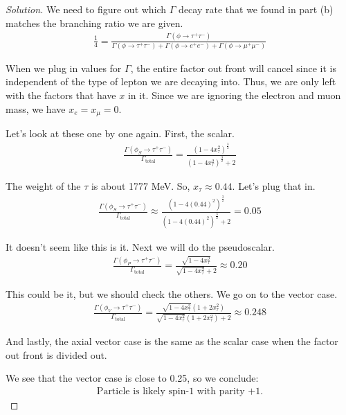 \documentclass[12pt]{article}
\newenvironment{solution}{\begin{proof}[Solution]}{\end{proof}}
\begin{document}
\begin{solution}
We need to figure out which $\Gamma$ decay rate that we found in part (b) matches the branching ratio we are given. 
\begin{align*}
    \frac{1}{4}=\frac{\Gamma(\phi\rightarrow \tau^+\tau^-)}{\Gamma(\phi\rightarrow \tau^+\tau^-)+\Gamma(\phi\rightarrow e^+e^-)+\Gamma(\phi\rightarrow \mu^+\mu^-)}
\end{align*}

When we plug in values for $\Gamma$, the entire factor out front will cancel since it is independent of the type of lepton we are decaying into. Thus, we are only left with the factors that have $x$ in it. Since we are ignoring the electron and muon mass, we have $x_e=x_\mu=0$.

Let's look at these one by one again. First, the scalar.
\begin{align*}
    \frac{\Gamma(\phi_S\rightarrow \tau^+\tau^-)}{\Gamma_{\text{total}}}=\frac{(1-4x_\tau^2)^\frac{3}{2}}{(1-4x_\tau^2)^\frac{3}{2}+2}
\end{align*}

The weight of the $\tau$ is about 1777 MeV. So, $x_\tau\approx 0.44$. Let's plug that in.
\begin{align*}
    \frac{\Gamma(\phi_S\rightarrow \tau^+\tau^-)}{\Gamma_{\text{total}}}\approx\frac{(1-4(0.44)^2)^\frac{3}{2}}{(1-4(0.44)^2)^\frac{3}{2}+2}=0.05
\end{align*}

It doesn't seem like this is it. Next we will do the pseudoscalar.
\begin{align*}
    \frac{\Gamma(\phi_P\rightarrow \tau^+\tau^-)}{\Gamma_{\text{total}}}=\frac{\sqrt{1-4x_\tau^2}}{\sqrt{1-4x_\tau^2}+2}\approx 0.20
\end{align*}

This could be it, but we should check the others. We go on to the vector case.
\begin{align*}
    \frac{\Gamma(\phi_V\rightarrow \tau^+\tau^-)}{\Gamma_{\text{total}}}=\frac{\sqrt{1-4x_\tau^2}(1+2x_\tau^2)}{\sqrt{1-4x_\tau^2}(1+2x_\tau^2)+2}\approx 0.248
\end{align*}

And lastly, the axial vector case is the same as the scalar case when the factor out front is divided out.

We see that the vector case is close to 0.25, so we conclude:
\begin{align*}
    \boxed{\text{Particle is likely spin-1 with parity +1.}}
\end{align*}
\end{solution}
\end{document}
